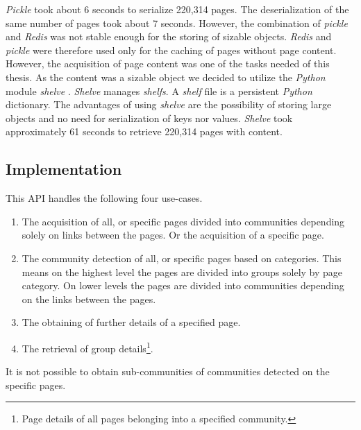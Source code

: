 \textit{Pickle} took about 6 seconds to serialize 220,314 pages. The deserialization of the same number of pages took about 7 seconds. However, the combination of \textit{pickle} and \textit{Redis} was not stable enough for the storing of sizable objects. \textit{Redis} and \textit{pickle} were therefore used only for the caching of pages without page content. However, the acquisition of page content was one of the tasks needed of this thesis. As the content was a sizable object we decided to utilize the \textit{Python} module \textit{shelve} \cite{shelve}. \textit{Shelve} manages \textit{shelfs}. A \textit{shelf} file is a persistent \textit{Python} dictionary. The advantages of using \textit{shelve} are the possibility of storing large objects and no need for serialization of keys nor values. \textit{Shelve} took approximately 61 seconds to retrieve 220,314 pages with content. 



\subsection{Implementation} \label{APIImplementation}
This API handles the following four use-cases. 
\begin{enumerate}
    \item The acquisition of all, or specific pages divided into communities depending solely on links between the pages. Or the acquisition of a specific page.
    \item  The community detection of all, or specific pages based on categories. This means on the highest level the pages are divided into groups solely by page category. On lower levels the pages are divided into communities depending on the links between the pages.
    \item The obtaining of further details of a specified page.
    \item The retrieval of group details\footnote{Page details of all pages belonging into a specified community.}. 
\end{enumerate} 
It is not possible to obtain sub-communities of communities detected on the specific pages.

